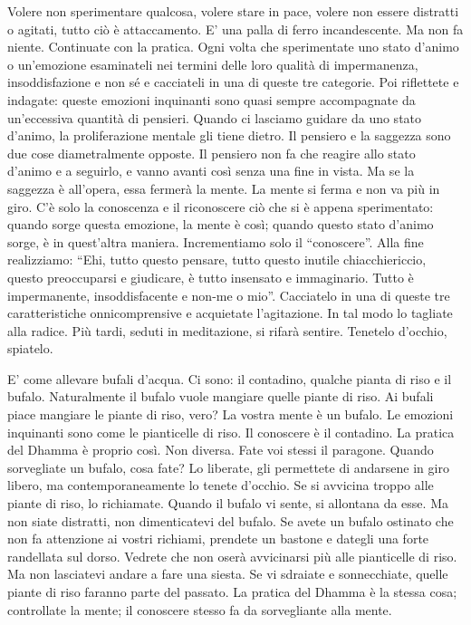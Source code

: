 Volere non sperimentare qualcosa, volere stare in pace, volere non
essere distratti o agitati, tutto ciò è attaccamento. E' una palla di
ferro incandescente. Ma non fa niente. Continuate con la pratica. Ogni
volta che sperimentate uno stato d'animo o un'emozione esaminateli nei
termini delle loro qualità di impermanenza, insoddisfazione e non sé e
cacciateli in una di queste tre categorie. Poi riflettete e indagate:
queste emozioni inquinanti sono quasi sempre accompagnate da
un'eccessiva quantità di pensieri. Quando ci lasciamo guidare da uno
stato d'animo, la proliferazione mentale gli tiene dietro. Il pensiero e
la saggezza sono due cose diametralmente opposte. Il pensiero non fa che
reagire allo stato d'animo e a seguirlo, e vanno avanti così senza una
fine in vista. Ma se la saggezza è all'opera, essa fermerà la mente. La
mente si ferma e non va più in giro. C'è solo la conoscenza e il
riconoscere ciò che si è appena sperimentato: quando sorge questa
emozione, la mente è così; quando questo stato d'animo sorge, è in
quest'altra maniera. Incrementiamo solo il ``conoscere''. Alla fine
realizziamo: ``Ehi, tutto questo pensare, tutto questo inutile
chiacchiericcio, questo preoccuparsi e giudicare, è tutto insensato e
immaginario. Tutto è impermanente, insoddisfacente e non-me o mio''.
Cacciatelo in una di queste tre caratteristiche onnicomprensive e
acquietate l'agitazione. In tal modo lo tagliate alla radice. Più tardi,
seduti in meditazione, si rifarà sentire. Tenetelo d'occhio, spiatelo.

E' come allevare bufali d'acqua. Ci sono: il contadino, qualche pianta
di riso e il bufalo. Naturalmente il bufalo vuole mangiare quelle piante
di riso. Ai bufali piace mangiare le piante di riso, vero? La vostra
mente è un bufalo. Le emozioni inquinanti sono come le pianticelle di
riso. Il conoscere è il contadino. La pratica del Dhamma è proprio così.
Non diversa. Fate voi stessi il paragone. Quando sorvegliate un bufalo,
cosa fate? Lo liberate, gli permettete di andarsene in giro libero, ma
contemporaneamente lo tenete d'occhio. Se si avvicina troppo alle piante
di riso, lo richiamate. Quando il bufalo vi sente, si allontana da esse.
Ma non siate distratti, non dimenticatevi del bufalo. Se avete un bufalo
ostinato che non fa attenzione ai vostri richiami, prendete un bastone e
dategli una forte randellata sul dorso. Vedrete che non oserà
avvicinarsi più alle pianticelle di riso. Ma non lasciatevi andare a
fare una siesta. Se vi sdraiate e sonnecchiate, quelle piante di riso
faranno parte del passato. La pratica del Dhamma è la stessa cosa;
controllate la mente; il conoscere stesso fa da sorvegliante alla mente.

